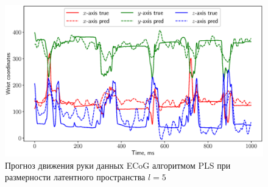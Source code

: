 \begin{figure}[ht]
	\centering
	\includegraphics[width=\textwidth]{figs/ch1/ecog_prediction}
	\caption{Прогноз движения руки данных ECoG алгоритмом PLS при размерности латентного пространства $l=5$}
	\label{fig::ecog_prediction}
\end{figure}


